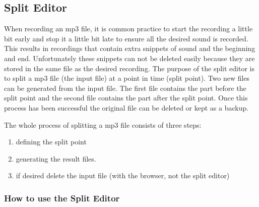 \subsection{Split Editor}
When recording an mp3 file, it is common practice to start the recording
a little bit early and stop it a little bit late to ensure all the
desired sound is recorded. This results in recordings that contain
extra snippets of sound and the beginning and end. Unfortunately these
snippets can not be deleted easily because they are stored in the same
file as the desired recording. The purpose of the split editor is to
split a mp3 file (the input file) at a point in time (split point). Two
new files can be generated from the input file. The first file contains
the part before the split point and the second file contains the part
after the split point. Once this process has been successful the
original file can be deleted or kept as a backup. 

The whole process of splitting a mp3 file consists of three steps: 

\begin{enumerate}
\item defining the split point 
\item generating the result files. 
\item if desired delete the input file (with the browser, not the split
editor) 
\end{enumerate}

\subsubsection{How to use the Split Editor}

